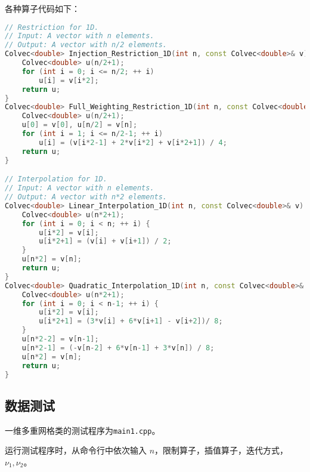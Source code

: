\documentclass{ctexart}
\begin{document}
各种算子代码如下：

\begin{lstlisting}[language = c++]
// Restriction for 1D.
// Input: A vector with n elements.
// Output: A vector with n/2 elements.
Colvec<double> Injection_Restriction_1D(int n, const Colvec<double>& v) {
	Colvec<double> u(n/2+1);
	for (int i = 0; i <= n/2; ++ i)
		u[i] = v[i*2];
	return u;
}
Colvec<double> Full_Weighting_Restriction_1D(int n, const Colvec<double>& v) {
	Colvec<double> u(n/2+1);
	u[0] = v[0], u[n/2] = v[n];
	for (int i = 1; i <= n/2-1; ++ i)
		u[i] = (v[i*2-1] + 2*v[i*2] + v[i*2+1]) / 4;
	return u;
}

// Interpolation for 1D.
// Input: A vector with n elements.
// Output: A vector with n*2 elements.
Colvec<double> Linear_Interpolation_1D(int n, const Colvec<double>& v) {
	Colvec<double> u(n*2+1);
	for (int i = 0; i < n; ++ i) {
		u[i*2] = v[i];
		u[i*2+1] = (v[i] + v[i+1]) / 2;
	}
	u[n*2] = v[n];
	return u;
}
Colvec<double> Quadratic_Interpolation_1D(int n, const Colvec<double>& v) {
	Colvec<double> u(n*2+1);
	for (int i = 0; i < n-1; ++ i) {
		u[i*2] = v[i];
		u[i*2+1] = (3*v[i] + 6*v[i+1] - v[i+2])/ 8;
	}
	u[n*2-2] = v[n-1];
	u[n*2-1] = (-v[n-2] + 6*v[n-1] + 3*v[n]) / 8;
	u[n*2] = v[n];
	return u;
}
\end{lstlisting}

\subsection{数据测试}

一维多重网格类的测试程序为\verb|main1.cpp|。

运行测试程序时，从命令行中依次输入 $n$，限制算子，插值算子，迭代方式，$\nu_1,\nu_2$。
\end{document}
